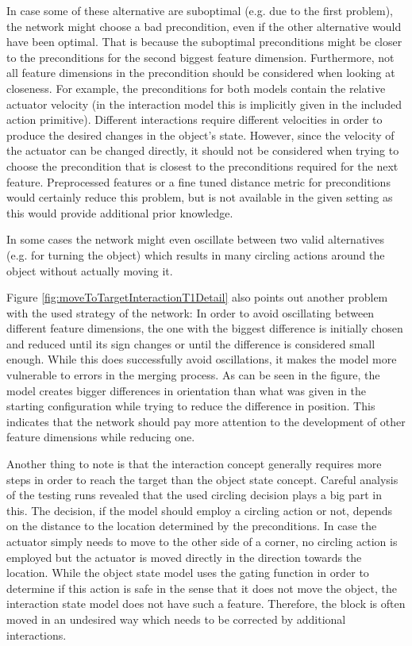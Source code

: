 In case some of these alternative are suboptimal (e.g. due to the first problem), the network might choose a bad precondition, even if the other alternative would have been optimal. That is because the suboptimal preconditions might be closer to the preconditions for the second biggest feature dimension. 
Furthermore, not all feature dimensions in the precondition should be considered when looking at closeness. For example, the preconditions for both models contain the relative actuator velocity (in the interaction model this is implicitly given in the included action primitive). 
Different interactions require different velocities in order to produce the desired changes in the object's state. 
However, since the velocity of the actuator can be changed directly, it should not be considered when trying to choose the precondition that is closest to the preconditions required for the next feature. Preprocessed features or a fine tuned distance metric for preconditions would certainly reduce this problem, but is not available in the given setting as this would provide additional prior knowledge.

In some cases the network might even oscillate between two valid alternatives (e.g. for turning the object) which results in many circling actions around the object without actually moving it.

Figure \ref{fig:moveToTargetInteractionT1Detail} also points out another problem with the used strategy of the network: In order to avoid oscillating between different feature dimensions, the one with the biggest difference is initially chosen and reduced until its sign changes or until the difference is considered small enough. While this does successfully avoid oscillations, it makes the model more vulnerable to errors in the merging process. As can be seen in the figure, the model creates bigger differences in orientation than what was given in the starting configuration while trying to reduce the difference in position. This indicates that the network should pay more attention to the development of other feature dimensions while reducing one.

Another thing to note is that the interaction concept generally requires more steps in order to reach the target than the object state concept. Careful analysis of the testing runs revealed that the used circling decision plays a big part in this. The decision, if the model should employ a circling action or not, depends on the distance to the location determined by the preconditions. In case the actuator simply needs to move to the other side of a corner, no circling action is employed but the actuator is moved directly in the direction towards the location. While the object state model uses the gating function in order to determine if this action is safe in the sense that it does not move the object, the interaction state model does not have such a feature. Therefore, the block is often moved in an undesired way which needs to be corrected by additional interactions.

